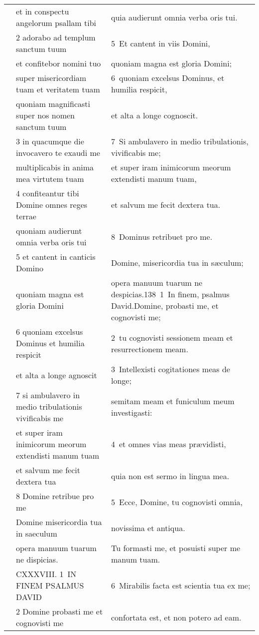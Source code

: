 \documentclass{article}
\begin{document}
\begin{longtable}{@{}p{}p{}p{}@{}}
	&	et in conspectu angelorum psallam tibi	&	quia audierunt omnia verba oris tui.	\\
	&	2 adorabo ad templum sanctum tuum	&	5 Et cantent in viis Domini,	\\
	&	et confitebor nomini tuo	&	quoniam magna est gloria Domini;	\\
	&	super misericordiam tuam et veritatem tuam	&	6 quoniam excelsus Dominus, et humilia respicit,	\\
	&	quoniam magnificasti super nos nomen sanctum tuum	&	et alta a longe cognoscit.	\\
	&	3 in quacumque die invocavero te exaudi me	&	7 Si ambulavero in medio tribulationis, vivificabis me;	\\
	&	multiplicabis in anima mea virtutem tuam	&	et super iram inimicorum meorum extendisti manum tuam,	\\
	&	4 confiteantur tibi Domine omnes reges terrae	&	et salvum me fecit dextera tua.	\\
	&	quoniam audierunt omnia verba oris tui	&	8 Dominus retribuet pro me.	\\
	&	5 et cantent in canticis Domino	&	Domine, misericordia tua in sæculum;	\\
	&	quoniam magna est gloria Domini	&	opera manuum tuarum ne despicias.138 1 In finem, psalmus David.Domine, probasti me, et cognovisti me;	\\
	&	6 quoniam excelsus Dominus et humilia respicit	&	2 tu cognovisti sessionem meam et resurrectionem meam.	\\
	&	et alta a longe agnoscit	&	3 Intellexisti cogitationes meas de longe;	\\
	&	7 si ambulavero in medio tribulationis vivificabis me	&	semitam meam et funiculum meum investigasti:	\\
	&	et super iram inimicorum meorum extendisti manum tuam	&	4 et omnes vias meas prævidisti,	\\
	&	et salvum me fecit dextera tua	&	quia non est sermo in lingua mea.	\\
	&	8 Domine retribue pro me	&	5 Ecce, Domine, tu cognovisti omnia,	\\
	&	Domine misericordia tua in saeculum	&	novissima et antiqua.	\\
	&	opera manuum tuarum ne dispicias.	&	Tu formasti me, et posuisti super me manum tuam.	\\
	&	CXXXVIII. 1 IN FINEM PSALMUS DAVID	&	6 Mirabilis facta est scientia tua ex me;	\\
	&	2 Domine probasti me et cognovisti me	&	confortata est, et non potero ad eam.	\\

\end{longtable}
\end{document}
